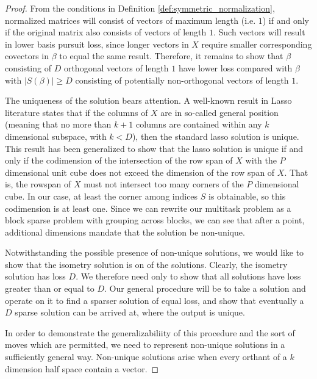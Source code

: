 \begin{proof}

From the conditions in Definition \ref{def:symmetric_normalization}, normalized matrices will consist of vectors of maximum length (i.e. $1$) if and only if the original matrix also consists of vectors of length $1$.
Such vectors will result in lower basis pursuit loss, since longer vectors in $X$ require smaller corresponding covectors in $\beta$ to equal the same result.
Therefore, it remains to show that $\beta$ consisting of $D$ orthogonal vectors of length $1$ have lower loss compared with $\beta$ with $|S(\beta)| \geq D$ consisting of potentially non-orthogonal vectors of length $1$.

The uniqueness of the solution bears attention.
A well-known result in Lasso literature states that if the columns of $X$ are in so-called general position (meaning that no more than $k+1$ columns are contained within any $k$ dimensional subspace, with $k < D$), then the standard lasso solution is unique.
This result has been generalized to show that the lasso solution is unique if and only if the codimension of the intersection of the row span of $X$ with the $P$ dimensional unit cube does not exceed the dimension of the row span of $X$.
That is, the rowspan of $X$ must not intersect too many corners of the $P$ dimensional cube.
In our case, at least the corner among indices $S$ is obtainable, so this codimension is at least one.
Since we can rewrite our multitask problem as a block sparse problem with grouping across blocks, we can see that after a point, additional dimensions mandate that the solution be non-unique.

Notwithstanding the possible presence of non-unique solutions, we would like to show that the isometry solution is on of the solutions.
Clearly, the isometry solution has loss $D$.
We therefore need only to show that all solutions have loss greater than or equal to $D$.
Our general procedure will be to take a solution and operate on it to find a sparser solution of equal loss, and show that eventually a $D$ sparse solution can be arrived at, where the output is unique.

In order to demonstrate the generalizabiliity of this procedure and the sort of moves which are permitted, we need to represent non-unique solutions in a sufficiently general way.
Non-unique solutions arise when every orthant of a $k$ dimension half space contain a vector.


 

\end{proof}
